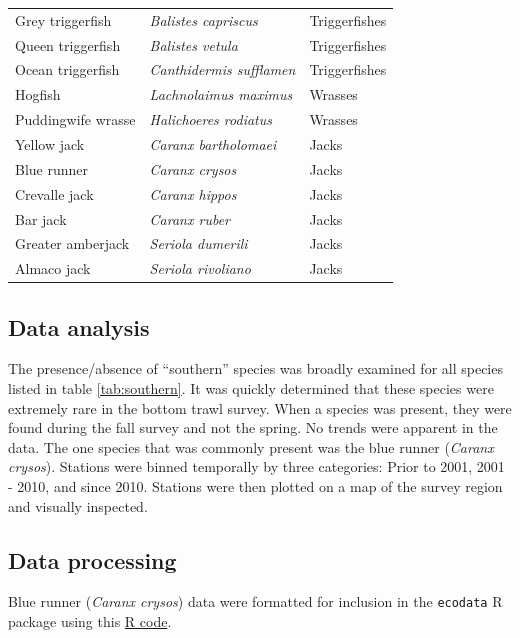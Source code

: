 \documentclass[
]{book}
\begin{document}
\begin{table}
\begin{tabular}[t]{l>{\em}ll}
Grey triggerfish & Balistes capriscus & Triggerfishes\\
\addlinespace
Queen triggerfish & Balistes vetula & Triggerfishes\\
Ocean triggerfish & Canthidermis sufflamen & Triggerfishes\\
Hogfish & Lachnolaimus maximus & Wrasses\\
Puddingwife wrasse & Halichoeres rodiatus & Wrasses\\
Yellow jack & Caranx bartholomaei & Jacks\\
\addlinespace
Blue runner & Caranx crysos & Jacks\\
Crevalle jack & Caranx hippos & Jacks\\
Bar jack & Caranx ruber & Jacks\\
Greater amberjack & Seriola dumerili & Jacks\\
Almaco jack & Seriola rivoliano & Jacks\\
\bottomrule
\end{tabular}
\end{table}

\hypertarget{data-analysis-30}{%
\subsection{Data analysis}\label{data-analysis-30}}

The presence/absence of ``southern'' species was broadly examined for all species listed in table \ref{tab:southern}. It was quickly determined that these species were extremely rare in the bottom trawl survey. When a species was present, they were found during the fall survey and not the spring. No trends were apparent in the data. The one species that was commonly present was the blue runner (\emph{Caranx crysos}). Stations were binned temporally by three categories: Prior to 2001, 2001 - 2010, and since 2010. Stations were then plotted on a map of the survey region and visually inspected.

\hypertarget{data-processing-22}{%
\subsection{Data processing}\label{data-processing-22}}

Blue runner (\emph{Caranx crysos}) data were formatted for inclusion in the \texttt{ecodata} R package using this \href{https://github.com/NOAA-EDAB/ecodata/blob/master/data-raw/get_blue_runner.R}{R code}.
\end{document}
